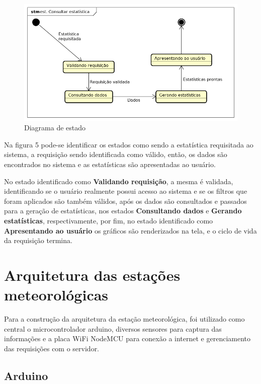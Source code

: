 \begin{center}
\begin{figure}[H]
    \centering
    \caption{Diagrama de estado \label{fig:figure_diagrama_estado}}
    \includegraphics[scale=0.50]{diagrams/estado.png}
    \hfill
{}
\end{figure}
\end{center}

Na figura 5 pode-se identificar os estados como sendo a estatística requisitada ao sistema, a requisição sendo identificada como válido, então, os dados são encontrados no sistema e as estatísticas são apresentadas ao usuário.

No estado identificado como \textbf{Validando requisição}, a mesma é validada, identificando se o usuário realmente possui acesso ao sistema e se os filtros que foram aplicados são também válidos, após os dados são consultados e passados para a geração de estatísticas, nos estados \textbf{Consultando dados} e \textbf{Gerando estatísticas}, respectivamente, por fim, no estado identificado como \textbf{Apresentando ao usuário} os gráficos são renderizados na tela, e o ciclo de vida da requisição termina.

\chapter{Arquitetura das estações meteorológicas}

Para a construção da arquitetura da estação meteorológica, foi utilizado como central o microcontrolador arduino, diversos sensores para captura das informações e a placa WiFi NodeMCU para conexão a internet e gerenciamento das requisições com o servidor.

\section{Arduino}
\label{sec:arduino}

